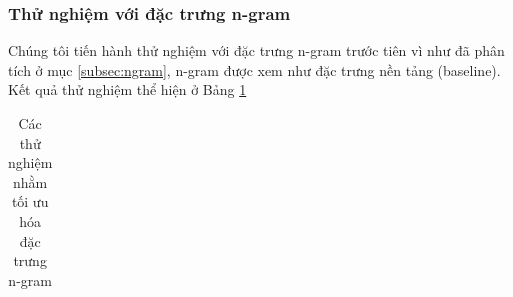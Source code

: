\subsubsection*{Thử nghiệm với đặc trưng n-gram}
Chúng tôi tiến hành thử nghiệm với đặc trưng n-gram trước tiên vì như đã phân tích ở mục \ref{subsec:ngram}, n-gram được xem như đặc trưng nền tảng (baseline). Kết quả thử nghiệm thể hiện ở Bảng \ref{table:ngram}
\begin{table}[H]
\centering
\begin{minipage}{1.0\textwidth}
\caption{Các thử nghiệm nhằm tối ưu hóa đặc trưng n-gram} \label{table:ngram}
\begin{tabular}{|l| m{} | >{\centering\arraybackslash} m{} | >{\centering\arraybackslash}m{} | >{\centering\arraybackslash}m{} | } 


\end{tabular}
\end{minipage}
\end{table}
